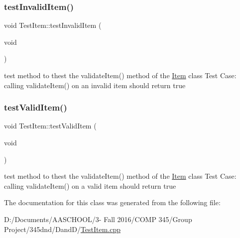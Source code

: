 \subsubsection{\texorpdfstring{test\+Invalid\+Item()}{testInvalidItem()}}
{\footnotesize\ttfamily void Test\+Item\+::test\+Invalid\+Item (\begin{DoxyParamCaption}\item[{void}]{ }\end{DoxyParamCaption})\hspace{0.3cm}{\ttfamily [protected]}}

test method to thest the validate\+Item() method of the \hyperlink{class_item}{Item} class Test Case\+: calling validate\+Item() on an invalid item should return true \hypertarget{class_test_item_a477b05d92bd3cce14d4d1815c7c4c166}{}\label{class_test_item_a477b05d92bd3cce14d4d1815c7c4c166} 
\subsubsection{\texorpdfstring{test\+Valid\+Item()}{testValidItem()}}
{\footnotesize\ttfamily void Test\+Item\+::test\+Valid\+Item (\begin{DoxyParamCaption}\item[{void}]{ }\end{DoxyParamCaption})\hspace{0.3cm}{\ttfamily [protected]}}

test method to thest the validate\+Item() method of the \hyperlink{class_item}{Item} class Test Case\+: calling validate\+Item() on a valid item should return true 

The documentation for this class was generated from the following file\+:\begin{DoxyCompactItemize}
\item 
D\+:/\+Documents/\+A\+A\+S\+C\+H\+O\+O\+L/3-\/ Fall 2016/\+C\+O\+M\+P 345/\+Group Project/345dnd/\+Dand\+D/\hyperlink{_test_item_8cpp}{Test\+Item.\+cpp}\end{DoxyCompactItemize}
